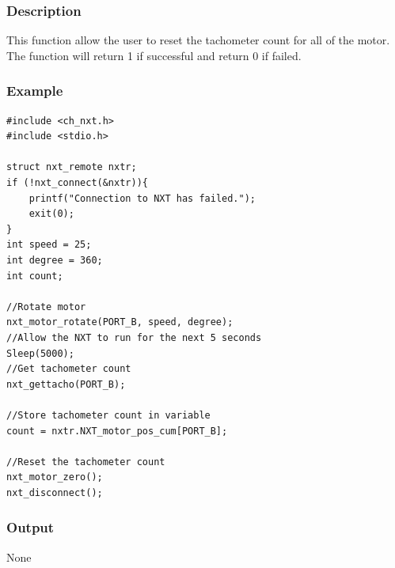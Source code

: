 \documentclass[12pt]{article}
\begin{document}
\subsubsection*{Description}
This function allow the user to reset the tachometer count for all of the motor. The function will return 1 if successful and return 0 if failed.

\subsubsection*{Example}
\begin{verbatim}
#include <ch_nxt.h> 
#include <stdio.h>

struct nxt_remote nxtr;
if (!nxt_connect(&nxtr)){
    printf("Connection to NXT has failed.");
    exit(0);
}
int speed = 25;
int degree = 360;
int count;

//Rotate motor
nxt_motor_rotate(PORT_B, speed, degree);
//Allow the NXT to run for the next 5 seconds
Sleep(5000);    
//Get tachometer count
nxt_gettacho(PORT_B);
    
//Store tachometer count in variable
count = nxtr.NXT_motor_pos_cum[PORT_B];
    
//Reset the tachometer count
nxt_motor_zero();
nxt_disconnect();
\end{verbatim}

\subsubsection*{Output}
None 
\\
\end{document}
